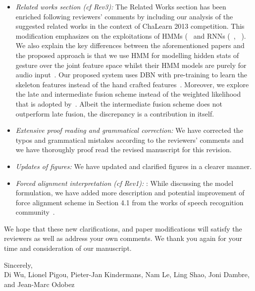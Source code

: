 \documentclass[12pt]{article}
\begin{document}
\begin{itemize}
\item {\em Related works section (cf Rev3):} The Related Works section has been enriched following reviewers' comments by  including our analysis of the suggested related works in the context of ChaLearn 2013 competition. This modification emphasizes on the exploitations of HMMs (~\cite{nandakumar2013multi, wu2013fusing} and RNNs (~\cite{neverova2013multi}, ~\cite{wu2013fusing, socher2012convolutional}). 
%
We also explain the key differences between the aforementioned papers and the proposed approach is that we use HMM for modelling hidden stats of gesture over the joint feature space whilst their HMM models are purely for audio input~\cite{nandakumar2013multi,wu2013fusing}.
%
Our proposed system uses DBN with pre-training to learn the skeleton features instead of the hand crafted features~\cite{neverova2013multi}. Moreover, we explore the late and intermediate fusion scheme instead of the weighted likelihood that is adopted by~\cite{nandakumar2013multi}.
%
Albeit the intermediate fusion scheme does not outperform late fusion, the discrepancy is a contribution in itself.

\item {\em Extensive proof reading and grammatical correction:} We have corrected the typos and grammatical mistakes according to the reviewers' comments and we have thoroughly proof read the revised manuscript for this revision.

\item {\em Updates of figures:} We have updated and clarified figures in a clearer manner.
%
 \item {\em Forced alignment interpretation (cf Rev1): }: While discussing the model formulation, we have added more description and potential improvement of force alignment scheme in Section 4.1 from the works of speech recognition community~\cite{yu2012automatic}.

\end{itemize}
We hope that these new clarifications, and paper modifications will satisfy the reviewers as well as address your own comments. We thank you again for your time and consideration of our manuscript.

\noindent Sincerely,\\[3mm]
Di Wu, Lionel Pigou, Pieter-Jan Kindermans, Nam Le, Ling Shao, Joni Dambre, and Jean-Marc Odobez



\end{document}

